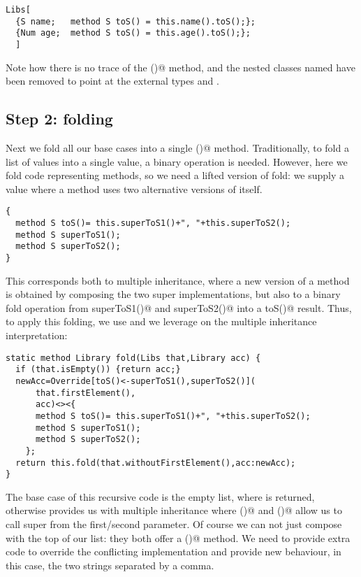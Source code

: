 \saveSpace
\begin{lstlisting}
Libs[
  {S name;   method S toS() = this.name().toS();};
  {Num age;  method S toS() = this.age().toS();};
  ]
\end{lstlisting}
\saveSpace

\noindent
Note how there is no trace of the \Q@sayHi()@ method, and the
nested classes named \Q@T@ have been removed to point at the
external types \Q@S@ and \Q@Num@.

\saveSpace\saveSpace
\subsection*{Step 2: folding}
Next we fold all our base cases into a single \Q@toS()@ method.
Traditionally, to fold a list of values into a single value, a binary operation is needed.
However, here we fold code representing methods,
so we need a lifted version of fold:
 we supply a \Q@Library@ value where a method
uses two alternative versions of itself. 

\saveSpace
\begin{lstlisting}
{
  method S toS()= this.superToS1()+", "+this.superToS2();
  method S superToS1();
  method S superToS2();
}
\end{lstlisting}
\saveSpace

This corresponds both to multiple inheritance, where a new version of a method is obtained by composing the two super implementations,
but also to a binary fold operation from \Q@S superToS1()@ and \Q@S superToS2()@
into a \Q@S toS()@ result.
Thus, to apply this folding, we use \Q@Override@ and we leverage on the multiple inheritance interpretation:

\saveSpace
\begin{lstlisting}
static method Library fold(Libs that,Library acc) {
  if (that.isEmpty()) {return acc;}
  newAcc=Override[toS()<-superToS1(),superToS2()](
      that.firstElement(),
      acc)<><{
      method S toS()= this.superToS1()+", "+this.superToS2();
      method S superToS1();
      method S superToS2();
    };
  return this.fold(that.withoutFirstElement(),acc:newAcc);
}
\end{lstlisting}
\saveSpace

The base case of this recursive code is the empty list, where \Q@acc@ is returned,
otherwise \Q@Override@ provides us with multiple inheritance where
()@ and ()@
allow us to call super from the first/second parameter.
Of course we can not just compose \Q@acc@ with the top of our list: they both offer
a \Q@toS()@ method. We need to provide extra code to override the conflicting implementation
and provide new behaviour, in this case, the two strings separated by a comma.

